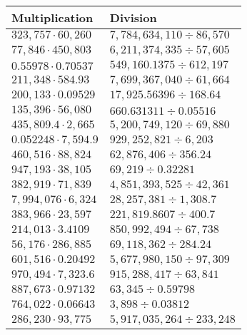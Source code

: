 \begin{longtable}[]{@{}ll@{}}
\toprule
Multiplication & Division\tabularnewline
\midrule
\endhead
\(323,757\cdot60,260\) & \(7,784,634,110÷86,570\)\tabularnewline
\(77,846\cdot450,803\) & \(6,211,374,335÷57,605\)\tabularnewline
\(0.55978\cdot0.70537\) & \(549,160.1375÷612,197\)\tabularnewline
\(211,348\cdot584.93\) & \(7,699,367,040÷61,664\)\tabularnewline
\(200,133\cdot0.09529\) & \(17,925.56396÷168.64\)\tabularnewline
\(135,396\cdot56,080\) & \(660.631311÷0.05516\)\tabularnewline
\(435,809.4\cdot2,665\) & \(5,200,749,120÷69,880\)\tabularnewline
\(0.052248\cdot7,594.9\) & \(929,252,821÷6,203\)\tabularnewline
\(460,516\cdot88,824\) & \(62,876,406÷356.24\)\tabularnewline
\(947,193\cdot38,105\) & \(69,219÷0.32281\)\tabularnewline
\(382,919\cdot71,839\) & \(4,851,393,525÷42,361\)\tabularnewline
\(7,994,076\cdot6,324\) & \(28,257,381÷1,308.7\)\tabularnewline
\(383,966\cdot23,597\) & \(221,819.8607÷400.7\)\tabularnewline
\(214,013\cdot3.4109\) & \(850,992,494÷67,738\)\tabularnewline
\(56,176\cdot286,885\) & \(69,118,362÷284.24\)\tabularnewline
\(601,516\cdot0.20492\) & \(5,677,980,150÷97,309\)\tabularnewline
\(970,494\cdot7,323.6\) & \(915,288,417÷63,841\)\tabularnewline
\(887,673\cdot0.97132\) & \(63,345÷0.59798\)\tabularnewline
\(764,022\cdot0.06643\) & \(3,898÷0.03812\)\tabularnewline
\(286,230\cdot93,775\) & \(5,917,035,264÷233,248\)\tabularnewline
\bottomrule
\end{longtable}
